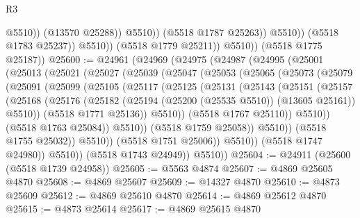 \begin{lexlean}{R3}
\begin{coremodule}
                                  @5510))
                              (@13570 @25288))
                            @5510))
                        (@5518 @1787 @25263))
                      @5510))
                  (@5518 @1783 @25237))
                @5510))
            (@5518 @1779 @25211))
          @5510))
      (@5518 @1775 @25187))
@25600 := @24961
    (@24969
      (@24975
        (@24987
          (@24995
            (@25001
              (@25013
                (@25021
                  (@25027
                    (@25039
                      (@25047
                        (@25053
                          (@25065
                            (@25073
                              (@25079
                                (@25091
                                  (@25099
                                    (@25105
                                      (@25117
                                        (@25125
                                          (@25131
                                            (@25143
                                              (@25151
                                                (@25157
                                                  (@25168
                                                    (@25176
                                                      (@25182
                                                        (@25194
                                                          (@25200 (@25535 @5510))
                                                          (@13605 @25161))
                                                        @5510))
                                                    (@5518 @1771 @25136))
                                                  @5510))
                                              (@5518 @1767 @25110))
                                            @5510))
                                        (@5518 @1763 @25084))
                                      @5510))
                                  (@5518 @1759 @25058))
                                @5510))
                            (@5518 @1755 @25032))
                          @5510))
                      (@5518 @1751 @25006))
                    @5510))
                (@5518 @1747 @24980))
              @5510))
          (@5518 @1743 @24949))
        @5510))
@25604 := @24911 (@25600 (@5518 @1739 @24958))
@25605 := @5563 @4874
@25607 := @4869 @25605 @4870
@25608 := @4869 @25607
@25609 := @14327 @4870
@25610 := @4873 @25609
@25612 := @4869 @25610 @4870
@25614 := @4869 @25612 @4870
@25615 := @4873 @25614
@25617 := @4869 @25615 @4870

\end{coremodule}
\end{lexlean}
